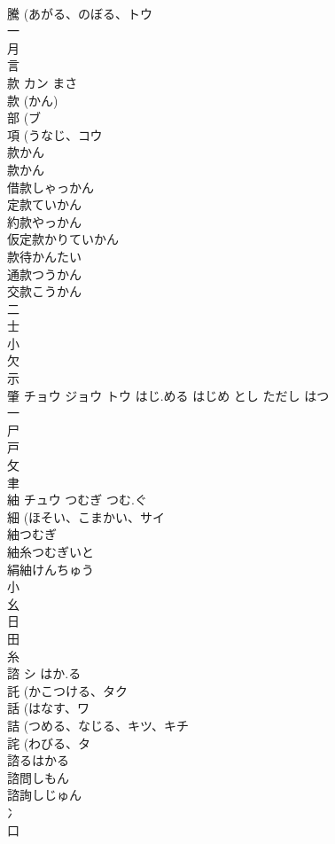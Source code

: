 \documentclass[8pt]{extreport}
\begin{document}
\begin{CJK}{UTF8}{min}
\\	騰 (あがる、のぼる、トウ 
\\	一 
\\	月 
\\	言 
\\	款	カン	まさ	
\\	款 (かん) 
\\	部 (ブ 
\\	項 (うなじ、コウ 
\\	款かん
\\	款かん
\\	借款しゃっかん
\\	定款ていかん
\\	約款やっかん
\\	仮定款かりていかん
\\	款待かんたい
\\	通款つうかん
\\	交款こうかん
\\	二 
\\	士 
\\	小 
\\	欠 
\\	示 
\\	肇	チョウ ジョウ トウ	はじ.める はじめ とし ただし はつ	
\\	一 
\\	尸 
\\	戸 
\\	攵 
\\	聿 
\\	紬	チュウ	つむぎ つむ.ぐ	
\\	細 (ほそい、こまかい、サイ 
\\	紬つむぎ 
\\	紬糸つむぎいと 
\\	絹紬けんちゅう 
\\	小 
\\	幺 
\\	日 
\\	田 
\\	糸 
\\	諮	シ	はか.る	
\\	託 (かこつける、タク 
\\	話 (はなす、ワ 
\\	詰 (つめる、なじる、キツ、キチ 
\\	詫 (わびる、タ 
\\	諮るはかる
\\	諮問しもん
\\	諮詢しじゅん
\\	冫 
\\	口 

\end{CJK}
\end{document}
